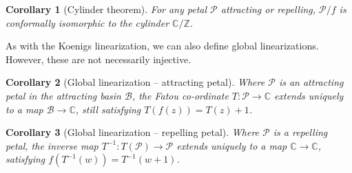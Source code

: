 \documentclass{article}
\newtheorem{cor}{Corollary}
\begin{document}
\begin{cor}[Cylinder theorem]
    \label{cor:cyl}
    For any petal $\mathcal{P}$ attracting or repelling, $\mathcal{P}/f$ is conformally isomorphic to the cylinder $\mathbb{C}/\mathbb{Z}$.
\end{cor}

As with the Koenigs linearization, we can also define global linearizations. However, these are not necessarily injective. 
\begin{cor}[Global linearization -- attracting petal]
    Where $\mathcal{P}$ is an attracting petal in the attracting basin $\mathcal{B}$, the Fatou co-ordinate $T:\mathcal{P}\to\mathbb{C}$ extends uniquely to a map $\mathcal{B}\to\mathbb{C}$, still satisfying $T(f(z))=T(z)+1$. 
\end{cor}
\begin{cor}[Global linearization -- repelling petal]
    Where $\mathcal{P}$ is a repelling petal, the inverse map $T^{-1}:T(\mathcal{P})\to\mathcal{P}$ extends uniquely to a map $\mathbb{C}\to\mathbb{C}$, satisfying $f(T^{-1}(w))=T^{-1}(w+1)$. 
\end{cor}
\end{document}
